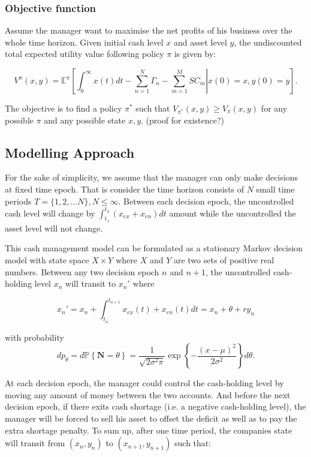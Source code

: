\documentclass[12pt]{article}
\begin{document}
\subsubsection{Objective function}
Assume the manager want to maximise the net profits of his business over the whole time horizon. Given initial cash level $x$ and asset level $y$, the undiscounted total expected utility value following policy $\pi$ is given by:

$$V^\pi(x,y) = \mathbb{E}^\pi\left[ \left. \int_0^ \infty x(t)   dt - \sum^N_{n=1} \Gamma_n  -  \sum^M_{m=1} SC_m  \right| x(0) = x, y(0) = y\right].$$ 


The objective is to find a policy $\pi ^*$ such that $V_{\pi^*}(x,y) \geq V_{\pi}(x,y)$ for any possible $\pi$ and any possible state $x,y$. {\color {red} {(proof for existence?)}}

\subsection{Modelling Approach}
For the sake of simplicity, we assume that the manager can only make decisions at fixed time epoch. That is consider the time horizon consists of $N$ small time periods $T=\{1,2,...N\}, N \leq \infty$. Between each decision epoch, the uncontrolled cash level will change by $\int^{t_2}_{t_1}(x_{ex}+x_{en})dt$ amount while the uncontrolled the asset level will not change. 

This cash management model can be formulated as a stationary Markov decision model with state space $X \times Y$ where $X$ and $Y$ are two sets of positive real numbers.  Between any two decision epoch $n$ and $n+1$, the uncontrolled cash-holding level $x_n$ will transit to $x_n'$ where


$$x_n' = x_n + \int_{t_n}^{t_{n+1}} x_{ex}(t) + x_{en}(t) dt= x_n + \theta + r y_n$$ 





with probability $$dp_\theta = d \mathbb{P} \left\{ \boldsymbol{N} = \theta \right\}  = \frac{1}{\sqrt{2\sigma^2\pi}} \exp \left\{ -\frac{(x-\mu)^2}{2\sigma^2}\right\} d\theta.$$ 


At each decision epoch, the manager could control the cash-holding level by moving any amount of money between the two accounts. And before the next decision epoch, if there exits cash shortage (i.e. a negative cash-holding level), the manager will be forced to sell his asset to offset the deficit as well as to pay the extra shortage penalty. To sum up, after one time period, the companies state will transit from $(x_n, y_n)$ to $(x_{n+1}, y_{n+1})$ such that:
\end{document}
